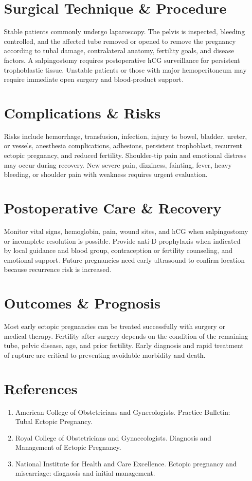 \section*{Surgical Technique \& Procedure}
Stable patients commonly undergo laparoscopy. The pelvis is inspected, bleeding controlled, and the affected tube removed or opened to remove the pregnancy according to tubal damage, contralateral anatomy, fertility goals, and disease factors. A salpingostomy requires postoperative hCG surveillance for persistent trophoblastic tissue. Unstable patients or those with major hemoperitoneum may require immediate open surgery and blood-product support.

\section*{Complications \& Risks}
Risks include hemorrhage, transfusion, infection, injury to bowel, bladder, ureter, or vessels, anesthesia complications, adhesions, persistent trophoblast, recurrent ectopic pregnancy, and reduced fertility. Shoulder-tip pain and emotional distress may occur during recovery. New severe pain, dizziness, fainting, fever, heavy bleeding, or shoulder pain with weakness requires urgent evaluation.

\section*{Postoperative Care \& Recovery}
Monitor vital signs, hemoglobin, pain, wound sites, and hCG when salpingostomy or incomplete resolution is possible. Provide anti-D prophylaxis when indicated by local guidance and blood group, contraception or fertility counseling, and emotional support. Future pregnancies need early ultrasound to confirm location because recurrence risk is increased.

\section*{Outcomes \& Prognosis}
Most early ectopic pregnancies can be treated successfully with surgery or medical therapy. Fertility after surgery depends on the condition of the remaining tube, pelvic disease, age, and prior fertility. Early diagnosis and rapid treatment of rupture are critical to preventing avoidable morbidity and death.

\section*{References}
\begin{enumerate}
\item American College of Obstetricians and Gynecologists. Practice Bulletin: Tubal Ectopic Pregnancy.
\item Royal College of Obstetricians and Gynaecologists. Diagnosis and Management of Ectopic Pregnancy.
\item National Institute for Health and Care Excellence. Ectopic pregnancy and miscarriage: diagnosis and initial management.
\end{enumerate}
